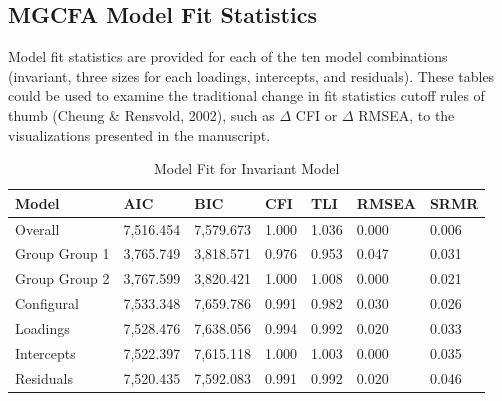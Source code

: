 \documentclass[
  man,floatsintext]{apa7}
\begin{document}
\subsection{MGCFA Model Fit Statistics}\label{mgcfa-model-fit-statistics}

Model fit statistics are provided for each of the ten model combinations (invariant, three sizes for each loadings, intercepts, and residuals). These tables could be used to examine the traditional change in fit statistics cutoff rules of thumb (Cheung \& Rensvold, 2002), such as \(\Delta\) CFI or \(\Delta\) RMSEA, to the visualizations presented in the manuscript.

\begin{table}[tbp]

\begin{center}
\begin{threeparttable}

\caption{\label{tab:tab1}Model Fit for Invariant Model}

\begin{tabular}{lllllll}
\toprule
Model & AIC & BIC & CFI & TLI & RMSEA & SRMR\\
\midrule
Overall & 7,516.454 & 7,579.673 & 1.000 & 1.036 & 0.000 & 0.006\\
Group Group 1 & 3,765.749 & 3,818.571 & 0.976 & 0.953 & 0.047 & 0.031\\
Group Group 2 & 3,767.599 & 3,820.421 & 1.000 & 1.008 & 0.000 & 0.021\\
Configural & 7,533.348 & 7,659.786 & 0.991 & 0.982 & 0.030 & 0.026\\
Loadings & 7,528.476 & 7,638.056 & 0.994 & 0.992 & 0.020 & 0.033\\
Intercepts & 7,522.397 & 7,615.118 & 1.000 & 1.003 & 0.000 & 0.035\\
Residuals & 7,520.435 & 7,592.083 & 0.991 & 0.992 & 0.020 & 0.046\\
\bottomrule
\end{tabular}

\end{threeparttable}
\end{center}

\end{table}
\end{document}
